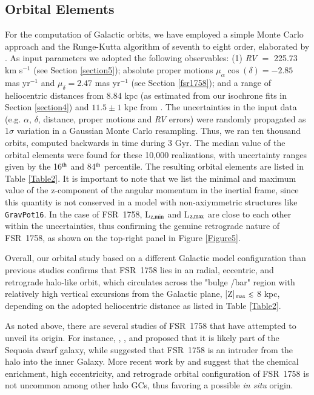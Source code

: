 \documentclass[longauth]{aa} %
\begin{document}
\subsection{Orbital Elements}

For the computation of Galactic orbits, we have employed a simple Monte Carlo approach and the Runge-Kutta algorithm of seventh to eight order, elaborated by \citet{fehlberg68}. As input parameters we adopted the following observables: (1) \textit{RV} $=$ 225.73 km s$^{-1}$ (see Section \ref{section5}); absolute proper motions $\mu_{\alpha}\cos(\delta)=-2.85$ mas yr$^{-1}$ and $\mu_{\delta}=2.47$ mas yr$^{-1}$ (see Section \ref{fsr1758}); and a range of heliocentric distances from $8.84$ kpc (as estimated from our isochrone fits in Section \ref{section4}) and $11.5\pm1$ kpc from \citet{Barba2019}. The uncertainties in the input data (e.g. $\alpha$, $\delta$, distance, proper motions and \textit{RV} errors) were randomly propagated as 1$\sigma$ variation in a Gaussian Monte Carlo resampling. Thus, we ran ten thousand orbits, computed backwards in time during 3 Gyr. The median value of the orbital elements were found for these 10,000 realizations, with uncertainty ranges given by the 16$^{\rm th}$ and 84$^{\rm th}$ percentile. The resulting orbital elements are listed in Table \ref{Table2}. It is important to note that we list the minimal and maximum value of the z-component of the angular momentum in the inertial frame, since this quantity is not conserved in a model with non-axiymmetric structures like \texttt{GravPot16}. In the case of FSR~1758, L$_{\rm z, min}$ and L$_{\rm z, max}$ are close to each other within the uncertainties, thus confirming the genuine retrograde nature of  FSR~1758, as shown on the top-right panel in Figure \ref{Figure5}.

Overall, our orbital study based on a different Galactic model configuration than previous studies confirms that FSR~1758 lies in an radial, eccentric, and retrograde halo-like orbit, which circulates across the "bulge /bar" region with relatively high vertical excursions  from the Galactic plane, |Z|$_{\rm max}\lesssim$ 8 kpc, depending on the adopted heliocentric distance as listed in Table \ref{Table2}. 

As noted above,  there are several studies of FSR~1758 that have attempted to unveil its origin. For instance, \citet{Barba2019}, \citet{Myeong2019}, and \citet{Massari2019} proposed that it is likely part of the Sequoia dwarf galaxy, while \citet{Simpson2019} suggested that FSR~1758 is an intruder from the halo into the inner Galaxy. More recent work by \citet{Villanova2019} and \citet{Yeh2020} suggest that the chemical enrichment,  high eccentricity, and retrograde orbital configuration of FSR~1758 is not uncommon among other halo GCs, thus favoring a possible \textit{in situ} origin.
\end{document}
